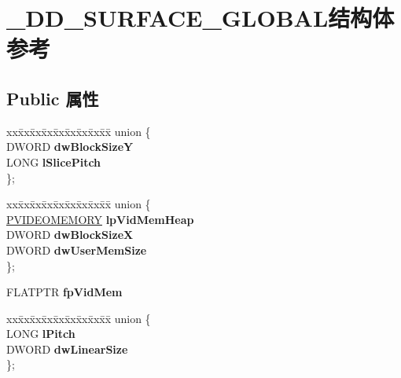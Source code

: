\hypertarget{struct___d_d___s_u_r_f_a_c_e___g_l_o_b_a_l}{}\section{\+\_\+\+D\+D\+\_\+\+S\+U\+R\+F\+A\+C\+E\+\_\+\+G\+L\+O\+B\+A\+L结构体 参考}
\label{struct___d_d___s_u_r_f_a_c_e___g_l_o_b_a_l}
\subsection*{Public 属性}
\begin{DoxyCompactItemize}
\item 
\mbox{\label{struct___d_d___s_u_r_f_a_c_e___g_l_o_b_a_l_a52d1ab0a252aeff77dd7050d7e7a444f}} 
\begin{tabbing}
xx\=xx\=xx\=xx\=xx\=xx\=xx\=xx\=xx\=\kill
union \{\\
\>DWORD {\bfseries dwBlockSizeY}\\
\>LONG {\bfseries lSlicePitch}\\
\}; \\

\end{tabbing}\item 
\mbox{\label{struct___d_d___s_u_r_f_a_c_e___g_l_o_b_a_l_a909942c099bbf550d54db18919cb6cd1}} 
\begin{tabbing}
xx\=xx\=xx\=xx\=xx\=xx\=xx\=xx\=xx\=\kill
union \{\\
\>\hyperlink{struct___v_i_d_e_o_m_e_m_o_r_y}{PVIDEOMEMORY} {\bfseries lpVidMemHeap}\\
\>DWORD {\bfseries dwBlockSizeX}\\
\>DWORD {\bfseries dwUserMemSize}\\
\}; \\

\end{tabbing}\item 
\mbox{\label{struct___d_d___s_u_r_f_a_c_e___g_l_o_b_a_l_acfaa2717c79165b66ba771421c71af2a}} 
F\+L\+A\+T\+P\+TR {\bfseries fp\+Vid\+Mem}
\item 
\mbox{\label{struct___d_d___s_u_r_f_a_c_e___g_l_o_b_a_l_afcc2306a621c933e1e49509ad11b881c}} 
\begin{tabbing}
xx\=xx\=xx\=xx\=xx\=xx\=xx\=xx\=xx\=\kill
union \{\\
\>LONG {\bfseries lPitch}\\
\>DWORD {\bfseries dwLinearSize}\\
\}; \\


\end{tabbing}
\end{DoxyCompactItemize}
